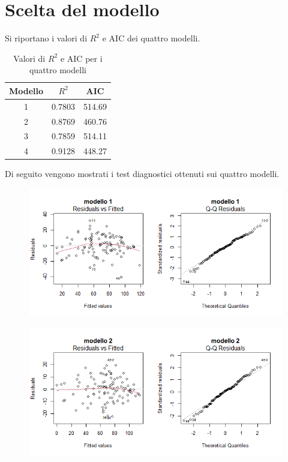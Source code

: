 \section{Scelta del modello}
Si riportano i valori di $R^2$ e AIC dei quattro modelli.
\begin{table}[H]
	\centering
	\begin{tabular}{|c|c|c|}
		\hline
		\textbf{Modello} & \boldmath$R^2$ & \textbf{AIC} \\
		\hline
		1 & 0.7803 & 514.69 \\
		2 & 0.8769 & 460.76 \\
		3 & 0.7859 & 514.11 \\
		4 & 0.9128 & 448.27 \\
		\hline
	\end{tabular}
	\caption{Valori di $R^2$ e AIC per i quattro modelli}
\end{table}
Di seguito vengono mostrati i test diagnostici ottenuti sui quattro modelli.
\begin{figure}[H]
	\centering
	\includegraphics[width=1\linewidth]{../graphs/diagnostica/diagnostica_ridotto}

	\label{fig:diagnosticaridotto}
\end{figure}
\begin{figure}[H]
	\centering
	\includegraphics[width=1\linewidth]{../graphs/diagnostica/diagnostica_quadrato}

	\label{fig:diagnosticaridotto}
\end{figure}
